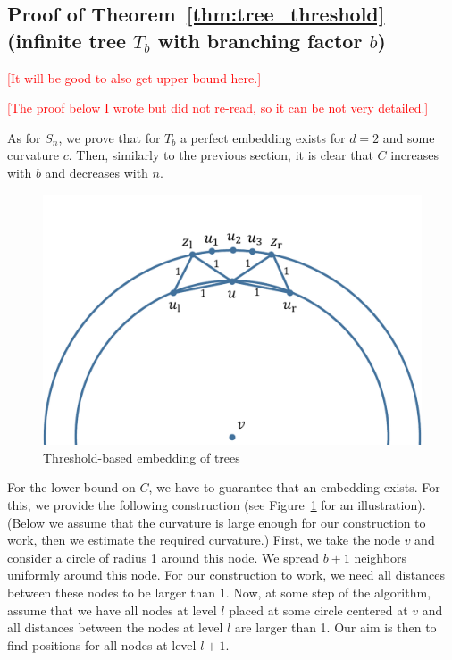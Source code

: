 \documentclass{article} %
\begin{document}

\subsection{Proof of Theorem~\ref{thm:tree_threshold} (infinite tree $T_b$ with branching factor $b$)}

\textcolor{red}{[It will be good to also get upper bound here.]}

\textcolor{red}{[The proof below I wrote but did not re-read, so it can be not very detailed.]}

As for $S_n$, we prove that for $T_b$ a perfect embedding exists for $d = 2$ and some curvature $c$. Then, similarly to the previous section, it is clear that $C$ increases with $b$ and decreases with $n$.


\begin{figure}
    \centering
    \includegraphics[width = 0.5 \textwidth]{trees.pdf}
    \caption{Threshold-based embedding of trees}
    \label{fig:trees}
\end{figure}


For the lower bound on $C$, we have to guarantee that an embedding exists. For this, we provide the following construction (see Figure~\ref{fig:trees} for an illustration).
(Below we assume that the curvature is large enough for our construction to work, then we estimate the required curvature.)
First, we take the node $v$ and consider a circle of radius 1 around this node. 
We spread $b + 1$ neighbors uniformly around this node. For our construction to work, we need all distances between these nodes to be larger than 1.
Now, at some step of the algorithm, assume that we have all nodes at level $l$ placed at some circle centered at $v$ and all distances between the nodes at level $l$ are larger than 1. Our aim is then to find positions for all nodes at level $l + 1$.
\end{document}
